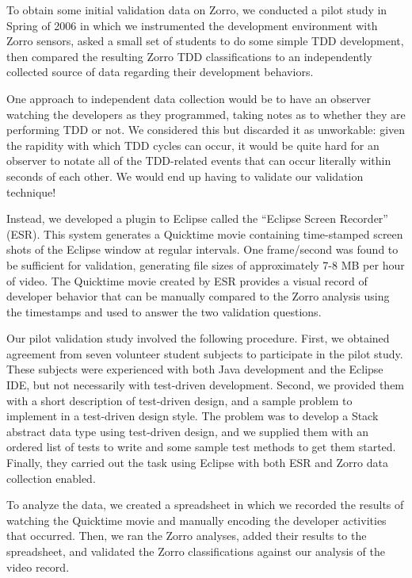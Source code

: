 \documentclass[smallextended]{svjour3}     %
\begin{document}
To obtain some initial validation data on Zorro, we conducted a pilot study
in Spring of 2006 in which we instrumented the development environment with
Zorro sensors, asked a small set of students to do some simple TDD
development, then compared the resulting Zorro TDD classifications to an
independently collected source of data regarding their development
behaviors.

One approach to independent data collection would be to have an observer
watching the developers as they programmed, taking notes as to whether they
are performing TDD or not.  We considered this but discarded it as
unworkable: given the rapidity with which TDD cycles can occur, it would be
quite hard for an observer to notate all of the TDD-related events that can
occur literally within seconds of each other. We would end up having to
validate our validation technique!

Instead, we developed a plugin to Eclipse called the ``Eclipse
Screen Recorder'' (ESR).  This system generates a Quicktime movie
containing time-stamped screen shots of the Eclipse window at regular
intervals. One frame/second was found to be sufficient for validation,
generating file sizes of approximately 7-8 MB per hour of video.  The
Quicktime movie created by ESR provides a visual record of developer
behavior that can be manually compared to the Zorro analysis using the
timestamps and used to answer the two validation questions.

Our pilot validation study involved the following procedure. First, we
obtained agreement from seven volunteer student subjects to participate in
the pilot study. These subjects were experienced with both Java development
and the Eclipse IDE, but not necessarily with test-driven development.
Second, we provided them with a short description of test-driven design,
and a sample problem to implement in a test-driven design style.  The
problem was to develop a Stack abstract data type using test-driven design,
and we supplied them with an ordered list of tests to write and some sample
test methods to get them started.  Finally, they carried out the task using
Eclipse with both ESR and Zorro data collection enabled.

To analyze the data, we created a spreadsheet in which we recorded the
results of watching the Quicktime movie and manually encoding the developer
activities that occurred.  Then, we ran the Zorro analyses, added their
results to the spreadsheet, and validated the Zorro classifications against
our analysis of the video record.
\end{document}

